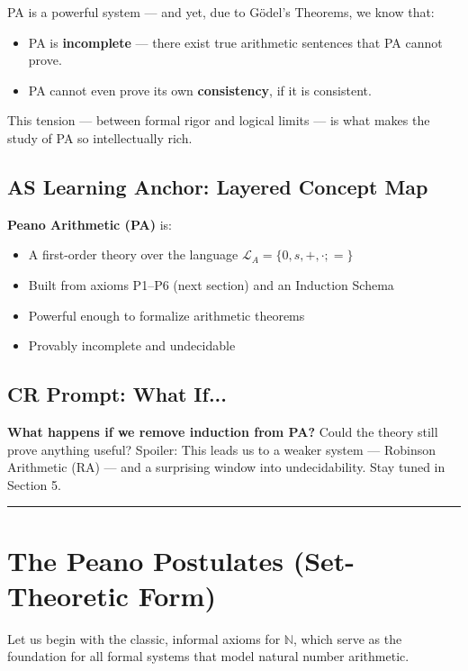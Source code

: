 \documentclass[12pt]{article}
\begin{document}
PA is a powerful system — and yet, due to Gödel's Theorems, we know that:

\begin{itemize}
  \item PA is \textbf{incomplete} — there exist true arithmetic sentences that PA cannot prove.
  \item PA cannot even prove its own \textbf{consistency}, if it is consistent.
\end{itemize}

This tension — between formal rigor and logical limits — is what makes the study of PA so intellectually rich.

\subsection*{AS Learning Anchor: Layered Concept Map}

\textbf{Peano Arithmetic (PA)} is:
\begin{itemize}
  \item A first-order theory over the language \( \mathcal{L}_A = \{0, s, +, \cdot; =\} \)
  \item Built from axioms P1–P6 (next section) and an Induction Schema
  \item Powerful enough to formalize arithmetic theorems
  \item Provably incomplete and undecidable
\end{itemize}

\subsection*{CR Prompt: What If...}
\textbf{What happens if we remove induction from PA?} Could the theory still prove anything useful? Spoiler: This leads us to a weaker system — Robinson Arithmetic (RA) — and a surprising window into undecidability. Stay tuned in Section 5.

\vspace{1em}
\hrule
\vspace{1em}

\section{The Peano Postulates (Set-Theoretic Form)}

Let us begin with the classic, informal axioms for \(\mathbb{N}\), which serve as the foundation for all formal systems that model natural number arithmetic.
\end{document}
